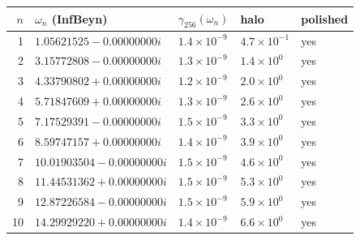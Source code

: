 \begin{tabular}{rllll}
\toprule
$n$ & $\omega_n$ (InfBeyn) & $\gamma_{256}(\omega_n)$ & halo & polished\\
\midrule
1 & $1.05621525-0.00000000i$ & $1.4\times10^{-9}$ & $4.7\times10^{-1}$ & yes\\
2 & $3.15772808-0.00000000i$ & $1.3\times10^{-9}$ & $1.4\times10^{0}$ & yes\\
3 & $4.33790802+0.00000000i$ & $1.2\times10^{-9}$ & $2.0\times10^{0}$ & yes\\
4 & $5.71847609+0.00000000i$ & $1.3\times10^{-9}$ & $2.6\times10^{0}$ & yes\\
5 & $7.17529391-0.00000000i$ & $1.5\times10^{-9}$ & $3.3\times10^{0}$ & yes\\
6 & $8.59747157+0.00000000i$ & $1.4\times10^{-9}$ & $3.9\times10^{0}$ & yes\\
7 & $10.01903504-0.00000000i$ & $1.5\times10^{-9}$ & $4.6\times10^{0}$ & yes\\
8 & $11.44531362+0.00000000i$ & $1.5\times10^{-9}$ & $5.3\times10^{0}$ & yes\\
9 & $12.87226584-0.00000000i$ & $1.5\times10^{-9}$ & $5.9\times10^{0}$ & yes\\
10 & $14.29929220+0.00000000i$ & $1.4\times10^{-9}$ & $6.6\times10^{0}$ & yes\\
\bottomrule
\end{tabular}
